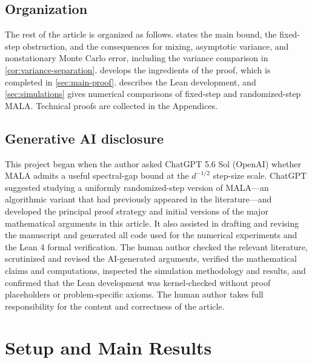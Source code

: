 \documentclass[11pt]{article}
\newcommand{\1}{\mathbf 1}
\begin{document}
	\subsection*{Organization}
	The rest of the article is organized as follows.
	 states the main bound, the fixed-step obstruction, and
	the consequences for mixing, asymptotic variance, and nonstationary
	Monte Carlo error, including the variance comparison in
	\cref{cor:variance-separation}.
	 develops the ingredients of the proof, which is
	completed in \cref{sec:main-proof}.
	 describes the Lean development, and
	\cref{sec:simulations} gives numerical comparisons of fixed-step and
	randomized-step MALA. Technical proofs are collected in the Appendices.
	
	
	\subsection*{Generative AI disclosure}
	
	This project began when the author asked ChatGPT 5.6 Sol (OpenAI) whether MALA admits a useful spectral-gap bound at the $d^{-1/2}$ step-size scale. ChatGPT suggested studying a uniformly randomized-step version of MALA—an algorithmic variant that had previously appeared in the literature—and developed the principal proof strategy and initial versions of the major mathematical arguments in this article. It also assisted in drafting and revising the manuscript and generated all code used for the numerical experiments and the Lean 4 formal verification. The human author checked the relevant literature, scrutinized and revised the AI-generated arguments, verified the mathematical claims and computations, inspected the simulation methodology and results, and confirmed that the Lean development was kernel-checked without proof placeholders or problem-specific axioms. The human author takes full responsibility for the content and correctness of the article.
	
	
	\section{Setup and Main Results} \label{sec:main}
	
\end{document}
